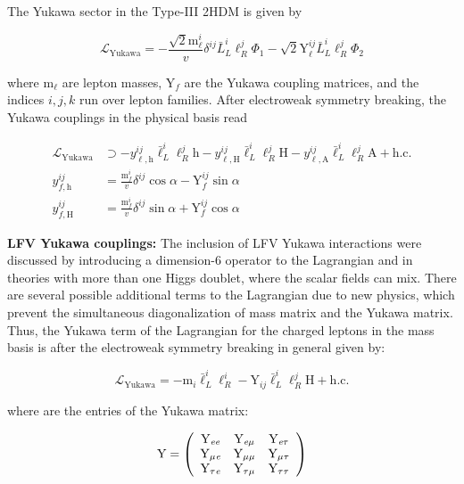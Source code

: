 The Yukawa sector in the Type-III 2HDM is given by

\begin{equation}
  \mathcal{L}_{\text{Yukawa}}=-\frac{\sqrt{2} \text{m}_{\ell}^{i}}{v} \delta^{i j} \bar{L}_{L}^{i} \ell_{R}^{j} \Phi_{1}-\sqrt{2} \text{Y}_{\ell}^{i j} \bar{L}_{L}^{i} \ell_{R}^{j} \Phi_{2}
\end{equation}

where $\text{m}_{\ell}$ are lepton masses, $\text{Y}_f$ are the Yukawa coupling matrices, and the indices $i, j, k$ run over lepton families. After electroweak symmetry breaking, the Yukawa couplings in the physical basis read

\begin{equation}
  \begin{aligned}
    \mathcal{L}_{\text{Yukawa}} &\supset -y_{\ell, \text{h}}^{i j} \bar{\ell}_{L}^{i} \ell_{R}^{j} \text{h} - y_{\ell, \text{H}}^{i j} \bar{\ell}_{L}^{i} \ell_{R}^{j} \text{H} - y_{\ell, \text{A}}^{i j} \bar{\ell}_{L}^{i} \ell_{R}^{j} \text{A} + \text{h.c.} \\
    y_{f, \text{h}}^{i j} &=\frac{\text{m}_{f}^{i}}{v} \delta^{i j} \cos \alpha - \text{Y}_{f}^{i j} \sin \alpha \\
    y_{f, \text{H}}^{i j} &=\frac{\text{m}_{f}^{i}}{v} \delta^{i j} \sin \alpha + \text{Y}_{f}^{i j} \cos \alpha
  \end{aligned}
\end{equation}

\textbf{LFV Yukawa couplings:} The inclusion of LFV Yukawa interactions were discussed by introducing a dimension-6 operator to the Lagrangian and in theories with more than one Higgs doublet, where the scalar fields can mix. There are several possible additional terms to the Lagrangian due to new physics, which prevent the simultaneous diagonalization of mass matrix and the Yukawa matrix. Thus, the Yukawa term of the Lagrangian for the charged leptons in the mass basis is after the electroweak symmetry breaking in general given by:

\begin{equation}
  \mathcal{L}_{\text{Yukawa}} = -\text{m}_{i} \bar{\ell}_{L}^{i} \ell_{R}^{i} - \text{Y}_{i j} \bar{\ell}_{L}^{i} \ell_{R}^{j} \text{H}+\text{h.c.}
\end{equation}

where \Yij are the entries of the Yukawa matrix:

\begin{equation}
  \text{Y}=\left(\begin{array}{ccc}
  \text{Y}_{\textit{e}\textit{e}} & \text{Y}_{\textit{e}\mu} & \text{Y}_{\textit{e}\tau} \\
  \text{Y}_{\mu\textit{e}} & \text{Y}_{\mu\mu} & \text{Y}_{\mu\tau} \\
  \text{Y}_{\tau\textit{e}} & \text{Y}_{\tau\mu} & \text{Y}_{\tau\tau}
  \end{array}\right)
\end{equation}

